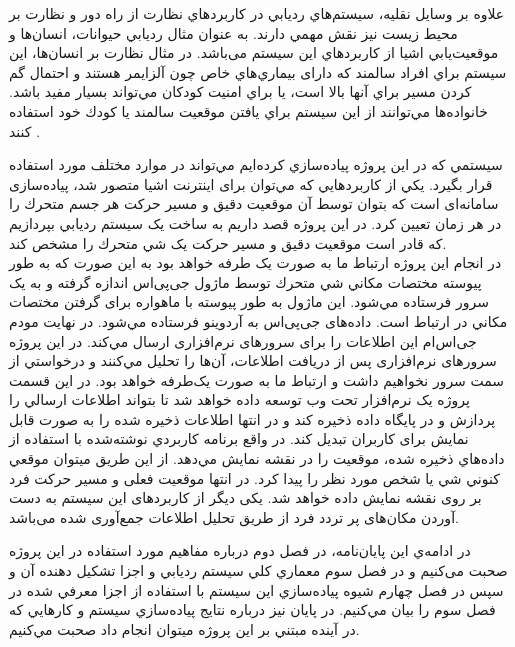 علاوه بر وسايل نقليه، سيستم‌هاي رديابي در كاربردهاي نظارت از راه دور و نظارت بر محیط زیست نيز نقش مهمي دارند. به عنوان مثال رديابي حيوانات، انسان‌ها و موقعيت‌يابي اشيا از كاربردهاي اين سيستم می‌باشد. در مثال نظارت بر انسان‌ها، اين سيستم براي افراد سالمند كه دارای بيماري‌هاي خاص چون آلزايمر هستند و احتمال گم كردن مسير براي آنها بالا است، يا براي امنيت كودكان مي‌تواند بسيار مفيد باشد. خانواده‌ها مي‌توانند از اين سيستم براي يافتن موقعيت سالمند يا كودك خود استفاده كنند \cite{Saranya2013}. 


سيستمي كه در اين پروژه پياده‌سازي كرده‌ايم مي‌تواند در موارد مختلف مورد استفاده قرار بگيرد.
يکي از كاربردهايي كه مي‌توان برای اينترنت اشيا متصور شد، پياده‌سازی سامانه‌ای است كه بتوان توسط آن موقعيت دقيق و مسير حركت هر جسم متحرك را در هر زمان تعيين كرد. در اين پروژه قصد داريم به ساخت يک سيستم رديابي بپردازيم كه قادر است موقعيت دقيق و مسير حركت يک شي متحرك را مشخص كند. \\در انجام اين پروژه ارتباط ما به صورت يک طرفه خواهد بود به اين صورت كه به طور پيوسته مختصات مکاني شي متحرك توسط ماژول جی‌پی‌اس اندازه گرفته و به يک سرور فرستاده مي‌شود. اين ماژول به طور پيوسته با ماهواره برای گرفتن مختصات مکاني در ارتباط است. داده‌های جی‌پی‌اس به آردوينو فرستاده مي‌شود. در نهايت مودم جی‌اس‌ام  اين اطلاعات را برای سرورهای نرم‌افزاری ارسال مي‌كند. در اين پروژه سرورهای نرم‌افزاری پس از دريافت اطلاعات، آن‌ها را تحليل مي‌كنند و درخواستي از سمت سرور نخواهيم داشت و ارتباط ما به صورت يک‌طرفه خواهد بود. در اين قسمت پروژه يک نرم‌افزار تحت وب توسعه داده خواهد شد تا بتواند اطلاعات ارسالي را پردازش و در پایگاه داده ذخيره كند و در انتها اطلاعات ذخيره شده را به صورت قابل نمايش برای كاربران تبديل كند. در واقع برنامه كاربردي نوشته‌شده با استفاده از داده‌هاي ذخیره شده، موقعيت را در نقشه نمايش مي‌دهد. از اين طريق ميتوان موقعي كنوني شي يا شخص مورد نظر را پيدا كرد. در انتها موقعیت فعلی و مسیر حرکت فرد بر روی نقشه نمایش داده خواهد شد. یکی دیگر از کاربردهای این سیستم به دست آوردن مکان‌های پر تردد فرد از طریق تحلیل اطلاعات جمع‌آوری شده می‌باشد.


در ادامه‌ي اين پايان‌نامه، در فصل دوم درباره مفاهیم مورد استفاده در این پروژه صحبت می‌کنیم و در فصل سوم معماري كلي سيستم رديابي و اجزا تشكيل دهنده آن و سپس در فصل چهارم شيوه پياده‌سازي اين سيستم با استفاده از اجزا معرفي شده در فصل سوم را بيان مي‌كنيم. در پايان نيز درباره نتايج پياده‌سازي سيستم و كارهايي كه در آينده مبتني بر اين پروژه ميتوان انجام داد صحبت مي‌كنيم.


   